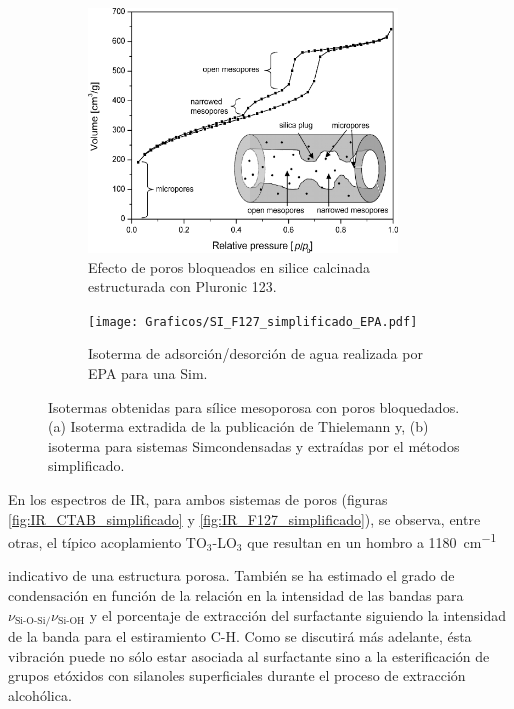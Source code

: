 {			%
			\begin{figure}[th]
		 	   	    \begin{subfigure}[t]{0.49\textwidth}
			       	\includegraphics[width=0.90\textwidth]{Graficos/Doble-distr.png}
			       	\caption{Efecto de poros bloqueados en silice calcinada estructurada con Pluronic 123.}
			       	\label{fig:thielemann}
			   		\end{subfigure}
			   		\begin{subfigure}[t]{0.49\textwidth}
			   	    \texttt{[image: Graficos/SI\_F127\_simplificado\_EPA.pdf]}
			   	    \caption{Isoterma de adsorción/desorción de agua realizada por EPA para una Sim\pdmF.}
			   		\end{subfigure}
					 \caption[Microscopías \pdmF\space tratamiento simplificado.]{Isotermas obtenidas para sílice mesoporosa con poros bloquedados. (a) Isoterma extradida de la publicación de Thielemann\cite{Thielemann2011} y, (b) isoterma para sistemas Sim\pdmF\space condensadas y extraídas por el métodos simplificado.}
					 \label{fig:F127_simplificado_EPA_2}	
				     \end{figure}

			 \pagebreak En los espectros de IR, para ambos sistemas de poros (figuras \ref{fig:IR_CTAB_simplificado} y \ref{fig:IR_F127_simplificado}), se observa, entre otras, el típico acoplamiento TO$_3$-LO$_3$ que resultan en un hombro a \SI{1180}{\cm^{-1}}} indicativo de una estructura porosa\cite{Innocenzi2003}. También se ha estimado el grado de condensación en función de la relación en la intensidad de las bandas para $\nu_{\text{Si-O-Si/}}\nu_{\text{Si-OH}}$ y el porcentaje de extracción del surfactante siguiendo la intensidad de la banda para el estiramiento C-H. Como se discutirá más adelante, ésta vibración puede no sólo estar asociada al surfactante sino a la esterificación de grupos etóxidos con silanoles superficiales durante el proceso de extracción alcohólica.

